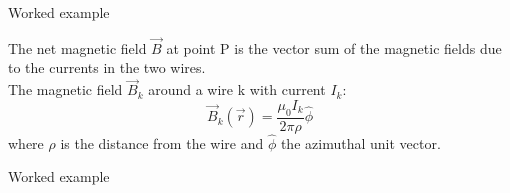 {\begin{frame}{Worked example}
\vspace{0.2cm}

{\small
The net magnetic field $\vec{B}$ at point P is the vector sum of the
magnetic fields due to the currents in the two wires.\\

The magnetic field $\vec{B}_k$ around a wire k with current $I_k$:
\begin{equation*}
      \vec{B}_k(\vec{r}) = \frac{\mu_0I_k}{2\pi \rho} \hat\phi
\end{equation*}
where $\rho$ is the distance from the wire and $\hat\phi$ the azimuthal unit vector.
}
\end{frame}


%
%
%

\begin{frame}{Worked example}


\end{frame}}
